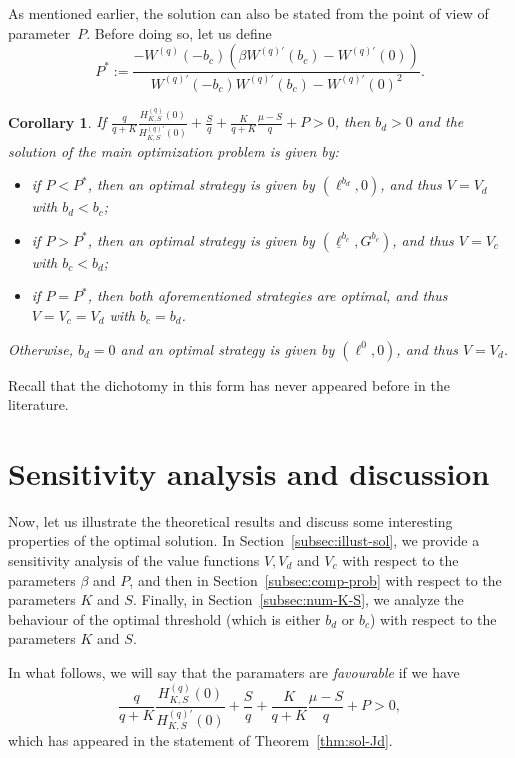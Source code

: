 \documentclass[11pt,reqno]{amsart}
\newtheorem{corollary}[theorem]{Corollary}
\newcommand{\Wq}{W^{(q)}}
\newcommand{\Wqprime}{W^{(q) \prime}}
\newcommand{\Hq}{H^{(q)}_{K,S}}
\newcommand{\Hqprime}{H^{(q) \prime}_{K,S}}
\newcommand{\ettaz}{\frac{S}{q} + \frac{K}{q+K}\frac{\mu - S}{q}}
\begin{document}
As mentioned earlier, the solution can also be stated from the point of view of parameter~$P$. Before doing so, let us define
\begin{equation}\label{P-star}
    P^* := \frac{-\Wq(-b_c)\left(\beta \Wqprime(b_c) - \Wqprime(0)\right)}{\Wqprime(-b_c) \Wqprime(b_c) - \Wqprime(0)^2} .
\end{equation}

\begin{corollary}\label{cor:sol-main}
If $\frac{q}{q+K}\frac{\Hq(0)}{\Hqprime(0)} + \ettaz + P > 0$, then $b_d>0$ and the solution of the main optimization problem is given by:
    \begin{itemize}
        \item if $P < P^*$, then an optimal strategy is given by $(\ell^{b_d}, 0)$, and thus $V = V_d$ with $b_d < b_c$;
        \item if $P > P^*$, then an optimal strategy is given by $(\underline \ell^{b_c}, G^{b_c})$, and thus $V = V_c$ with $b_c < b_d$;
        \item if $P = P^*$, then both aforementioned strategies are optimal, and thus $V=V_c=V_d$ with $b_c=b_d$.
    \end{itemize}
Otherwise, $b_d=0$ and an optimal strategy is given by $(\ell^0, 0)$, and thus $V = V_d$.
\end{corollary}

Recall that the dichotomy in this form has never appeared before in the literature. 

\section{Sensitivity analysis and discussion}\label{sec:numerical}

Now,  let us illustrate the theoretical results and discuss some interesting properties of the optimal solution. In Section~\ref{subsec:illust-sol}, we provide a sensitivity analysis of the value functions $V, V_d$ and $V_c$ with respect to the parameters $\beta$ and $P$, and then in Section~\ref{subsec:comp-prob} with respect to the parameters $K$ and $S$. Finally, in Section~\ref{subsec:num-K-S}, we analyze the behaviour of the optimal threshold (which is either $b_d$ or $b_c$) with respect to the parameters $K$ and $S$.

In what follows, we will say that the paramaters are \textit{favourable} if we have
\[
\frac{q}{q+K}\frac{\Hq(0)}{\Hqprime(0)} + \ettaz + P > 0 ,
\]
which has appeared in the statement of Theorem~\ref{thm:sol-Jd}.
\end{document}
